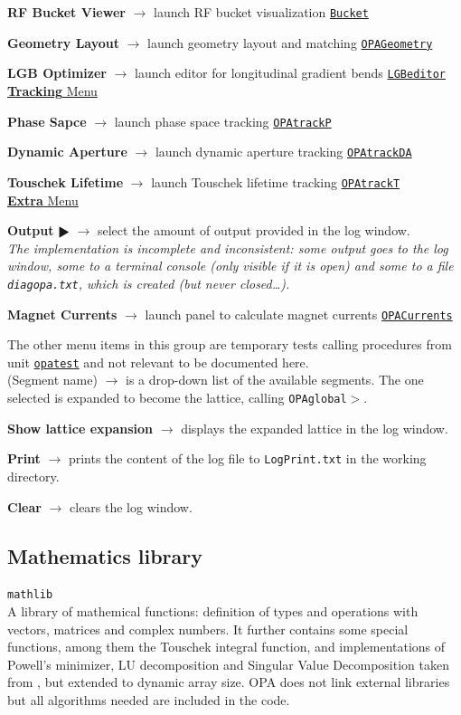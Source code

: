 \documentclass[12pt]{article}
\newcommand\code[1]{{\tt #1}}
\newcommand{\ofld}[1]{\colorbox{black!15}{{\bf #1}}}
\newcommand{\ofldx}[1]{\colorbox{black!15}{(#1)}}
\newcommand\guico[1]{{\color{blue}\code{#1}}}
\newcommand{\unico}[1]{{\color{burntorange}\code{#1}}}
\newcommand{\evcod}[2]{\ofld{#1} $\rightarrow$ \guico{#2}}
\newcommand{\evcodx}[2]{\ofldx{#1} $\rightarrow$ \guico{#2}}
\newcommand{\prcod}[2]{\opauni{#1}$>$\unico{#2}}
\newcommand{\opagui}[1]{\colorbox{blue!20}{\code{#1}}}
\newcommand{\ogui}[1]{\hyperref[#1]{\opagui{#1}}}
\newcommand{\opauni}[1]{\colorbox{orange!30}{\code{#1}}}
\newcommand{\ounih}[2]{\subsection{\label{#2}#1}{\Huge\opauni{#2}}\\}
\newcommand{\ouni}[1]{\hyperref[#1]{\opauni{#1}}}
\newcommand{\desc}[1]{#1}
\newcommand{\todo}[1]{{\color{red}\em #1}}
\begin{document}
{\evcod{RF Bucket Viewer}{ds\_rfbu} launch RF bucket visualization \ogui{Bucket}

\evcod{Geometry Layout}{ds\_geo } launch geometry layout and matching \ogui{OPAGeometry}

\evcod{LGB Optimizer}{ds\_lgbo } launch editor for longitudinal gradient bends \ogui{LGBeditor}\\


\underline{\ofld{Tracking} Menu}

\evcod{Phase Sapce}{tr\_phsp} launch phase space tracking \ogui{OPAtrackP}

\evcod{Dynamic Aperture}{tr\_dyna} launch dynamic aperture tracking \ogui{OPAtrackDA}

\evcod{Touschek Lifetime}{tr\_ttau} launch Touschek lifetime tracking \ogui{OPAtrackT}\\

\underline{\ofld{Extra} Menu}

\evcod{Output $\RHD$}{tm\_di} select the amount of output provided in the log window.\\ \todo{The implementation is incomplete and inconsistent: some output goes to the log window, some to a terminal console (only visible if it is open) and some to a file \code{diagopa.txt}, which is created (but never closed\dots).}

\evcod{Magnet Currents}{tm\_cur} launch panel to calculate magnet currents \ogui{OPACurrents}

The other menu items in this group are temporary tests calling procedures from unit \ouni{opatest} and not relevant to be documented here.\\

\evcodx{Segment name}{ComboSeg} is a drop-down list of the available segments. The one selected is expanded to become the lattice, calling \prcod{OPAglobal}{MakeLattice}.

\evcod{Show lattice expansion}{butlatsh} displays the expanded lattice in the log window.

\evcod{Print}{ButLogPrt} prints the content of the log file to \code{LogPrint.txt} in the working directory.

\evcod{Clear}{ButLogClr} clears the log window.
}


\ounih{Mathematics library}{mathlib}

\desc{
A library of mathemical functions: definition of types and operations with vectors, matrices and complex numbers. It further contains some special functions, among them the Touschek integral function, and implementations of Powell's minimizer, LU decomposition and Singular Value Decomposition taken from \cite{numrec}, but extended to dynamic array size. OPA does not link external libraries but all algorithms needed are included in the code.}
\end{document}

